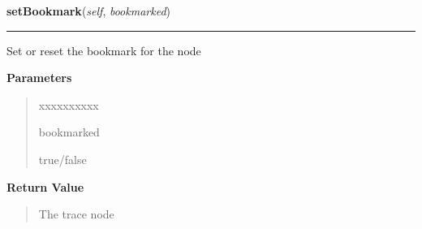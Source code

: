 \hspace{.8\funcindent}\begin{boxedminipage}{\funcwidth}

    \raggedright \textbf{setBookmark}(\textit{self}, \textit{bookmarked})

    \vspace{-1.5ex}

    \rule{\textwidth}{0.5\fboxrule}
\setlength{\parskip}{2ex}
    Set or reset the bookmark for the node

\setlength{\parskip}{1ex}
      \textbf{Parameters}
      \vspace{-1ex}

      \begin{quote}
        \begin{Ventry}{xxxxxxxxxx}

          \item[bookmarked]

          true/false

        \end{Ventry}

      \end{quote}

      \textbf{Return Value}
    \vspace{-1ex}

      \begin{quote}
      The trace node

      \end{quote}

    \end{boxedminipage}

    \label{tracetool:TraceNode:setVisible}

    \vspace{0.5ex}

